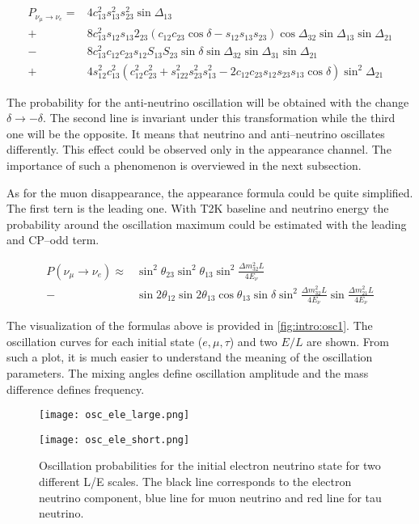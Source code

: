\documentclass[../main.tex]{subfiles}
\begin{document}
\begin{equation}
\begin{split}
P_{\nu_\mu\to\nu_e}= &4c_{13}^2s_{13}^2s_{23}^2\sin\Delta_{13} \\
+&8c_{13}^2s_{12}s_{13}2_{23}\left(c_{12}c_{23}\cos\delta-s_{12}s_{13}s_{23}\right)\cos\Delta_{32}\sin\Delta_{13}\sin\Delta_{21} \\
-&8c_{13}^2c_{12}c_{23}s_{12}S_{13}S_{23}\sin\delta\sin\Delta_{32}\sin\Delta_{31}\sin\Delta_{21} \\
+&4s_{12}^2c_{13}^2\left(c_{12}^2c^2_{23}+s^2_{122}s^2_{23}s^2_{13}-2c_{12}c_{23}s_{12}s_{23}s_{13}\cos\delta\right)\sin^2\Delta_{21}
\end{split}
\label{eq:intro:app_p}
\end{equation}

The probability for the anti-neutrino oscillation will be obtained with the change $\delta\to-\delta$. The second line is invariant under this transformation while the third one will be the opposite. It means that neutrino and anti--neutrino oscillates differently. This effect could be observed only in the appearance channel. The importance of such a phenomenon is overviewed in the next subsection.

As for the muon disappearance, the appearance formula could be quite simplified. The first tern is the leading one. With T2K baseline and neutrino energy the probability around the oscillation maximum could be estimated with the leading and CP--odd term.

\begin{align}
\label{eq:intro:nue_simple}
P\left(\nu_\mu\to\nu_e\right)\approx&\sin^2\theta_{23}\sin^2\theta_{13}\sin^2\frac{\Delta m_{32}^2L}{4E_\nu} \\
-&\sin2\theta_{12}\sin2\theta_{13}\cos\theta_{13}\sin\delta\sin^2\frac{\Delta m_{32}^2L}{4E_\nu}\sin\frac{\Delta m_{21}^2L}{4E_\nu}
\end{align}

The visualization of the formulas above is provided in \autoref{fig:intro:osc1}. The oscillation curves for each initial state ($e, \mu, \tau$) and two $E/L$ are shown. From such a plot, it is much easier to understand the meaning of the oscillation parameters. The mixing angles define oscillation amplitude and the mass difference defines frequency.

\begin{figure}[!ht]
\centering
\begin{minipage}{0.4\linewidth}
  \centering
  \texttt{[image: osc\_ele\_large.png]}
\end{minipage}
\hfill
\begin{minipage}{0.4\linewidth}
  \centering
  \texttt{[image: osc\_ele\_short.png]}
\end{minipage}
\caption{Oscillation probabilities for the initial electron neutrino state for two different L/E scales. The black line corresponds to the electron neutrino component, blue line for muon neutrino and red line for tau neutrino.}
\label{fig:intro:osc1}
\end{figure}
\end{document}
